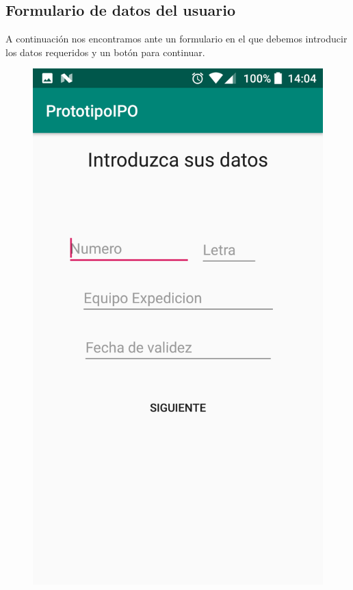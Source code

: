 \documentclass[a4paper,11pt]{article}
\begin{document}
\subsection{Formulario de datos del usuario}
A continuación nos encontramos ante un formulario en el que debemos introducir los datos requeridos y un botón para continuar.
\begin{figure}[H]
\centering
\begin{minipage}{0.45\linewidth}
\includegraphics[width=\textwidth]{8.png}

\end{minipage}
\end{figure}
\end{document}
